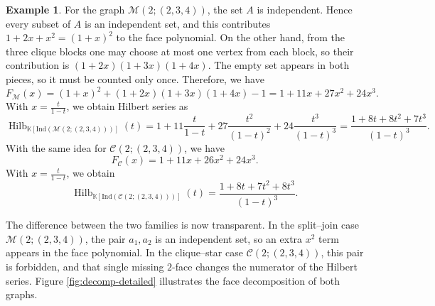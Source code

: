 \documentclass[12pt]{article}
\theoremstyle{definition}
\newtheorem{example}[theorem]{Example}
\theoremstyle{remark}
\DeclareMathOperator{\Hilb}{Hilb}
\newcommand{\kk}{\mathbb{K}}
\newcommand{\MM}{\mathcal{M}}
\newcommand{\CC}{\mathcal{C}}
\newcommand{\ind}{\mathrm{Ind}}
\begin{document}
	\begin{example}\label{ex:hilbert-example}
		 For the graph $\MM(2;(2,3,4))$, the set $A$ is independent. Hence every subset of $A$ is an independent set, and this contributes $ 1+2x+x^2=(1+x)^2 $ to the face polynomial. On the other hand, from the three clique blocks one may choose at most one vertex from each block, so their contribution is
		$ (1+2x)(1+3x)(1+4x). $
		The empty set appears in both pieces, so it must be counted only once. Therefore, we have
		$$
		F_{\MM}(x)=(1+x)^2+(1+2x)(1+3x)(1+4x)-1=1+11x+27x^2+24x^3.
		$$
		With $x=\tfrac{t}{1-t}$, we obtain Hilbert series as
		$$
		\Hilb_{\kk[\ind(\MM(2;(2,3,4)))]}(t)
		= 1+11\frac{t}{1-t}+27\frac{t^2}{(1-t)^2}+24\frac{t^3}{(1-t)^3}=\frac{1+8t+8t^2+7t^3}{(1-t)^3}.
		$$
		With the same idea for $\CC(2;(2,3,4))$, we have 
		$$
		F_{\CC}(x)=1+11x+26x^2+24x^3.
		$$
		With $x=\tfrac{t}{1-t}$, we obtain 
		$$
		\Hilb_{\kk[\ind(\CC(2;(2,3,4)))]}(t)
		= \frac{1+8t+7t^2+8t^3}{(1-t)^3}.
		$$
		
		The difference between the two families is now transparent. In the split--join case $\MM(2;(2,3,4))$, the pair ${a_1,a_2}$ is an independent set, so an extra $x^2$ term appears in the face polynomial. In the clique--star case $\CC(2;(2,3,4))$, this pair is forbidden, and that single missing $2$-face changes the numerator of the Hilbert series. Figure \ref{fig:decomp-detailed} illustrates the face decomposition of both graphs.
	\end{example}
	
\end{document}
